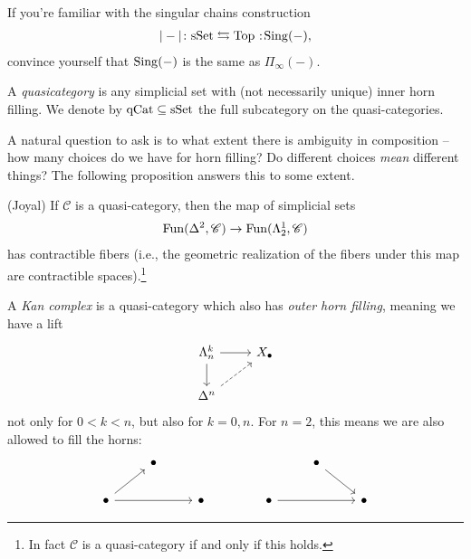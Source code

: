 \documentclass[11pt,openany]{book}
\begin{document}
\begin{exercise} If you're familiar with the singular chains construction
\begin{align*}
    |-| \colon \sSet \leftrightarrows \Top \noloc \Sing(-),
\end{align*}
convince yourself that $\mathrm{Sing}(-)$ is the same as $\Pi_\infty(-)$.
\end{exercise}


\begin{definition} A \textit{quasicategory} is any simplicial set with (not necessarily unique) inner horn filling. We denote by $\mathrm{qCat} \subseteq \mathrm{sSet}$ the full subcategory on the quasi-categories.
\end{definition}

A natural question to ask is to what extent there is ambiguity in composition -- how many choices do we have for horn filling? Do different choices \textit{mean} different things? The following proposition answers this to some extent.

\begin{proposition} (Joyal) If $\mathscr{C}$ is a quasi-category, then the map of simplicial sets
\begin{align*}
    \mathrm{Fun}(\Delta^2,\mathscr{C})\to \mathrm{Fun}(\Lambda_2^1,\mathscr{C})
\end{align*}
has contractible fibers (i.e., the geometric realization of the fibers under this map are contractible spaces).\footnote{In fact $\mathscr{C}$ is a quasi-category if and only if this holds.}

\end{proposition}





\begin{definition} A \textit{Kan complex} is a quasi-category which also has \textit{outer horn filling}, meaning we have a lift
\[ \begin{tikzcd}
    \Lambda^k_n\rar\dar & X_\bullet\\
    \Delta^n\ar[ur,dashed] & 
\end{tikzcd} \]
not only for $0<k<n$, but also for $k=0,n$. For $n=2$, this means we are also allowed to fill the horns:
\[ \begin{tikzcd}
     & \bullet\\
    \bullet\ar[ur]\ar[rr] & & \bullet
\end{tikzcd} \quad\quad \quad\quad  \begin{tikzcd}
    & \bullet\ar[dr] & \\
    \bullet\ar[rr] & & \bullet
\end{tikzcd} \]
\end{definition}
\end{document}

